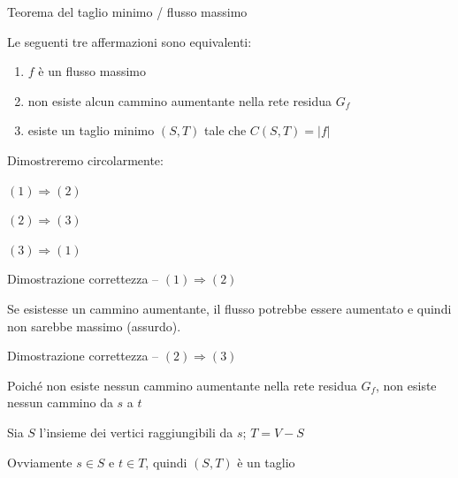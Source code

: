 \begin{frame}{Teorema del taglio minimo / flusso massimo}

\vspace{-9pt}
\begin{myboxtitle}[Teorema]
Le seguenti tre affermazioni sono equivalenti:
\begin{enumerate}
\item $f$ è un \alert{flusso massimo}
\item non esiste alcun cammino aumentante nella rete residua $G_f$
\item esiste un \alert{taglio minimo} $(S,T)$ tale che $C(S,T) = |f|$
\end{enumerate}
\end{myboxtitle}

\bigskip
Dimostreremo circolarmente:
\BIL
\item $(1) \Rightarrow (2)$
\item $(2) \Rightarrow (3)$
\item $(3) \Rightarrow (1)$
\EIL

\end{frame}

\begin{frame}{Dimostrazione correttezza -- $(1) \Rightarrow (2)$}


\BIL
\item Se esistesse un cammino aumentante, il flusso potrebbe essere aumentato e quindi non sarebbe massimo (assurdo).
\EIL

\end{frame}

\begin{frame}{Dimostrazione correttezza -- $(2) \Rightarrow (3)$}

\vspace{-9pt}


\begin{center}
\end{center}

\small
\BI
\item Poiché non esiste nessun cammino aumentante nella rete residua $G_f$, non esiste nessun cammino
da $s$ a $t$
\item Sia $S$ l'insieme dei vertici raggiungibili da $s$; $T=V-S$
\item Ovviamente $s \in S$ e $t \in T$, quindi $(S,T)$ è un taglio
\EI

\end{frame}


